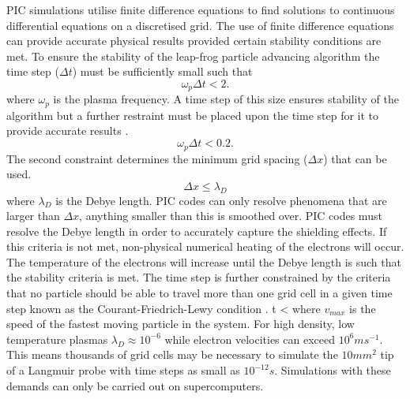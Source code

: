 PIC simulations utilise finite difference equations to find solutions to continuous differential equations on a discretised grid. The use of finite difference equations can provide accurate physical results provided certain stability conditions are met. To ensure the stability of the leap-frog particle advancing algorithm the time step ($\Delta t$) must be sufficiently small such that
\begin{equation}
\omega_p \Delta t <2.
\end{equation}
where $\omega_p $ is the plasma frequency. A time step of this size ensures stability of the algorithm but a further restraint must be placed upon the time step for it to provide accurate results \cite{bible}. 
\begin{equation}
\omega_p \Delta t <0.2.
\end{equation}
The second constraint determines the minimum grid spacing ($\Delta x$) that can be used. 
\begin{equation}
\Delta x \leq \lambda_D
\end{equation}
where $\lambda_D$ is the Debye length. PIC codes can only resolve phenomena that are larger than $\Delta x$, anything smaller than this is smoothed over. PIC codes must resolve the Debye length in order to accurately capture the shielding effects. If this criteria is not met, non-physical numerical heating of the electrons will occur. The temperature of the electrons will increase until the Debye length is such that the stability criteria is met.  
The time step is further constrained by the criteria that no particle should be able to travel more than one grid cell in a given time step known as the Courant-Friedrich-Lewy condition \cite{JH-thesis}.
\be 
\Delta t < 
\ee
where $v_{max}$ is the speed of the fastest moving particle in the system. For high density, low temperature plasmas $\lambda_D \approx 10^{-6}$ while electron velocities can exceed $10^6 ms^{-1}$. This means thousands of grid cells may be necessary to simulate the $10mm^2$ tip of a Langmuir probe with time steps as small as $10^{-12}s$. Simulations with these demands can only be carried out on supercomputers.
 


